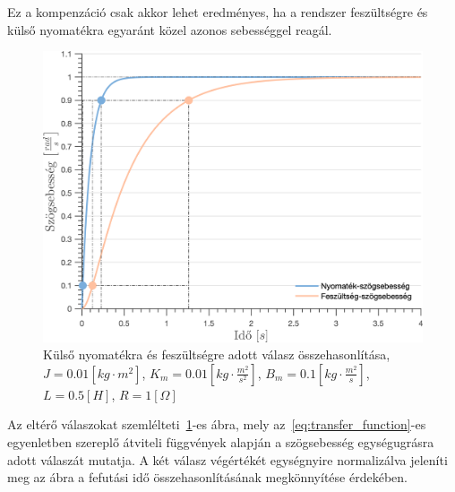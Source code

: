 


Ez a kompenzáció
csak akkor lehet eredményes, ha a rendszer feszültségre és külső nyomatékra 
egyaránt közel azonos sebességgel reagál.
\begin{figure}[ht]
    \begin{center}
    \includegraphics[width=\textwidth]{images/step_response.png}
    \caption{Külső nyomatékra és feszültségre adott válasz összehasonlítása, 
    $J = 0.01 \left[kg\cdot m^2\right]$,
    $K_m = 0.01 \left[kg\cdot \frac{m^2}{s^2}\right]$,
    $B_m = 0.1 \left[kg\cdot \frac{m^2}{s}\right]$,
    $L = 0.5 \left[H\right]$,
    $R = 1 \left[\Omega\right]$}\label{fig:step_response}
    \end{center}
\end{figure}
Az eltérő válaszokat 
szemlélteti~\ref{fig:step_response}-es ábra, mely az~\eqref{eq:transfer_function}-es
egyenletben szereplő átviteli függvények alapján a szögsebesség egységugrásra adott válaszát mutatja. 
A két válasz végértékét egységnyire normalizálva jeleníti meg az ábra a fefutási idő 
összehasonlításának megkönnyítése érdekében. 

